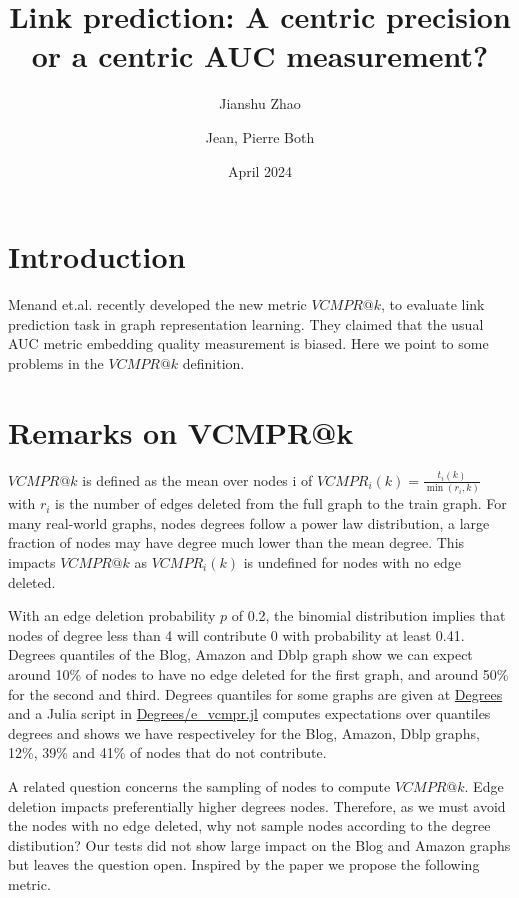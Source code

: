 \documentclass{article}
\title{Link prediction: A centric precision or a centric AUC measurement?}
\author[1]{Jianshu Zhao}
\author[2,*]{Jean, Pierre Both}
\affil[1]{Center for Bioinformatics and Computational Genomics, Georgia Institute of Technology, Atlanta, Georgia, USA}
\affil[2]{Université Paris-Saclay, CEA, List, Palaiseau, France. (Retired)}
\affil[*]{Corresponding author : jeanpierre.both@gmail.com}
\date{April 2024}
\begin{document}
\maketitle

\section{Introduction}

Menand et.al. \cite{Menand2024link} recently developed the new metric $VCMPR@k$, to evaluate link prediction task in graph representation learning.
They claimed that the usual AUC metric embedding quality measurement is biased.
Here we point to some problems in the  $VCMPR@k$ definition.

\section{Remarks on VCMPR@k}
$VCMPR@k$ is defined as the mean over nodes i of $VCMPR_{i}(k)= \frac{t_{i}(k)}{\min(r_{i},k)}$ with $ r_{i} $ is the number of edges deleted from the full graph to the train graph.
For many real-world graphs, nodes degrees follow a power law distribution, a large fraction of nodes may have degree much lower than the mean degree.
This impacts $VCMPR@k$  as $VCMPR_{i}(k)$ is undefined for nodes with no edge deleted.

With an edge deletion probability $p$ of 0.2, the binomial distribution implies that nodes of degree less than 4 will contribute 0 with probability at least 0.41.
Degrees quantiles of the Blog, Amazon and Dblp graph show we can expect around 10\% of nodes to have no edge deleted for the first graph,
and around 50\% for the second and third. Degrees quantiles for some graphs are given at \href{https://github.com/jean-pierreBoth/linkauc/tree/master/Degrees}{\color{blue}Degrees}
and a Julia script in \href{https://github.com/jean-pierreBoth/linkauc/tree/master/Degrees}{\color{blue}Degrees/e\_vcmpr.jl}
computes expectations over quantiles degrees and shows we have respectiveley for the Blog, Amazon, Dblp graphs, 12\%, 39\% and 41\% of nodes that do not contribute.

A related question concerns the sampling of nodes to compute $VCMPR@k$. Edge deletion impacts preferentially higher degrees nodes.
Therefore, as we must avoid the nodes with no edge deleted, why not sample nodes according to the degree distibution?
Our tests did not show large impact on the Blog and Amazon graphs but leaves the question open. Inspired by the paper we propose the following metric.
\end{document}
